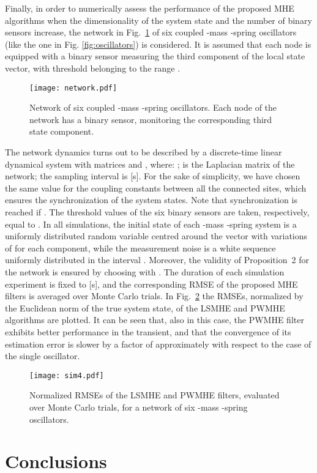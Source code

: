 \documentclass[11pt,journal,onecolumn]{IEEEtran}
\begin{document}
Finally, in order to numerically assess the performance of the proposed MHE algorithms when the dimensionality of the system state and the number of  binary sensors increase, the network in Fig.~\ref{fig:network} of six coupled -mass -spring oscillators (like the one in Fig. \ref{fig:oscillators}) is considered. It is assumed that each node is equipped with a binary sensor measuring the third component of the local state vector, with threshold belonging to the range .
\begin{figure}[tb]
\centering
\texttt{[image: network.pdf]}
\caption{Network of six coupled -mass -spring oscillators. Each node of the network has a binary sensor, monitoring the corresponding third state component.}
\label{fig:network}
\end{figure}
The network dynamics turns out to be described by a discrete-time linear dynamical system with matrices   and , where: ;  is the Laplacian matrix of the network; the sampling interval is  [s]. For the sake of simplicity, we have chosen the same value  for the coupling constants between all the connected sites, which ensures the synchronization of the system states. Note that synchronization is reached if . The threshold values of the six binary sensors are taken, respectively, equal to . In all  simulations, the initial state of each -mass -spring system is a uniformly distributed random variable centred around the vector  with variations of  for each component, while the measurement noise is a white sequence uniformly distributed in the interval . Moreover, the validity of Proposition~2 for the network is ensured by choosing  with . The duration of each simulation experiment is fixed to  [s], and the corresponding RMSE of the proposed MHE filters is averaged over  Monte Carlo trials. In Fig.~\ref{fig:RMSE_network} the RMSEs, normalized by the Euclidean norm of the true system state, of the LSMHE and PWMHE algorithms are plotted. It can be seen that, also in this case, the PWMHE filter exhibits better performance in the transient, and that the convergence of its estimation error is slower by a factor of approximately  with respect to the case of the single oscillator.
\begin{figure}[tb]
\centering
\texttt{[image: sim4.pdf]}
\caption{Normalized RMSEs of the LSMHE and PWMHE filters, evaluated over  Monte Carlo trials, for a network of six -mass -spring oscillators.}
\label{fig:RMSE_network}
\end{figure}

\section{Conclusions}
\end{document}
